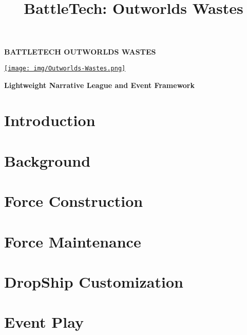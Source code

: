 \documentclass{article}
\title{BattleTech: Outworlds Wastes}
\author{}
\date{}
\newcommand{\mysectiontitle}{}
\newcommand{\newsection}[2]{\renewcommand{\mysectiontitle}{#2}\section{#1}}
\begin{document}
\makeatletter
{}

\begin{center}
  \fontsize{50}{60}\bfseries\selectfont\MakeUppercase{BattleTech}
  \fontsize{30}{37}\bfseries\selectfont\MakeUppercase{Outworlds Wastes}

  \href{https://ko-fi.com/bleptarts}{\texttt{[image: img/Outworlds-Wastes.png]}}

  \LARGE\bfseries{Lightweight Narrative League and Event Framework}
\end{center}

\newsection{Introduction}{introduction}



\newpage

\newsection{Background}{background}



\newsection{Force Construction}{force-construction}



\newpage

\newsection{Force Maintenance}{force-management}



\newpage

\newsection{DropShip Customization}{dropship-customization}



\newpage

\newsection{Event Play}{event-play}
\label{sec:event_play}
\end{document}
